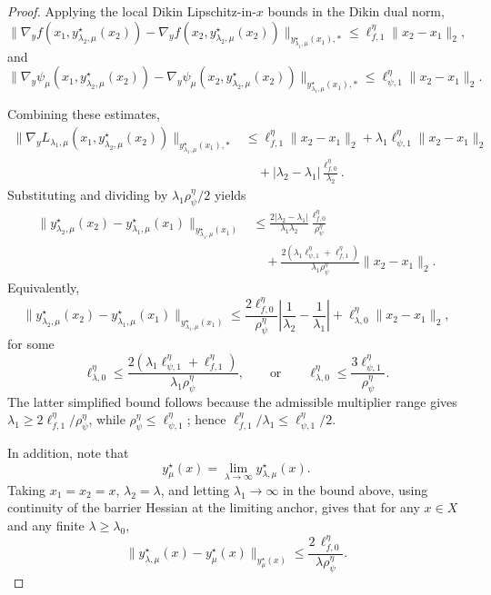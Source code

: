 \documentclass{article}
\begin{document}
\begin{proof}
Applying the local Dikin Lipschitz-in-\(x\) bounds in the Dikin dual norm,
\[
\bigl\|
\nabla_y f(x_1,y_{\lambda_2,\mu}^\star(x_2))
-
\nabla_y f(x_2,y_{\lambda_2,\mu}^\star(x_2))
\bigr\|_{y_{\lambda_1,\mu}^\star(x_1),*}
\le
\ell_{f,1}^\eta\|x_2-x_1\|_2,
\]
and
\[
\bigl\|
\nabla_y\psi_\mu(x_1,y_{\lambda_2,\mu}^\star(x_2))
-
\nabla_y\psi_\mu(x_2,y_{\lambda_2,\mu}^\star(x_2))
\bigr\|_{y_{\lambda_1,\mu}^\star(x_1),*}
\le
\ell_{\psi,1}^\eta\|x_2-x_1\|_2.
\]

Combining these estimates,
\begin{align*}
\bigl\|
\nabla_y L_{\lambda_1,\mu}(x_1,y_{\lambda_2,\mu}^\star(x_2))
\bigr\|_{y_{\lambda_1,\mu}^\star(x_1),*}
&\le
\ell_{f,1}^\eta\|x_2-x_1\|_2
+
\lambda_1\ell_{\psi,1}^\eta\|x_2-x_1\|_2 \\
&\quad
+
|\lambda_2-\lambda_1|\frac{\ell_{f,0}^\eta}{\lambda_2}.
\end{align*}
Substituting and dividing by \(\lambda_1\rho_\psi^\eta/2\) yields
\begin{align*}
\bigl\|
y_{\lambda_2,\mu}^\star(x_2)-y_{\lambda_1,\mu}^\star(x_1)
\bigr\|_{y_{\lambda_1,\mu}^\star(x_1)}
&\le
\frac{2|\lambda_2-\lambda_1|}{\lambda_1\lambda_2}
\frac{\ell_{f,0}^\eta}{\rho_\psi^\eta} \\
&\quad
+
\frac{2(\lambda_1\ell_{\psi,1}^\eta+\ell_{f,1}^\eta)}
{\lambda_1\rho_\psi^\eta}
\|x_2-x_1\|_2 .
\end{align*}
Equivalently,
\[
\bigl\|
y_{\lambda_2,\mu}^\star(x_2)-y_{\lambda_1,\mu}^\star(x_1)
\bigr\|_{y_{\lambda_1,\mu}^\star(x_1)}
\le
\frac{2\ell_{f,0}^{\eta}}{\rho_\psi^\eta}
\left|
\frac1{\lambda_2}-\frac1{\lambda_1}
\right|
+
\ell_{\lambda,0}^{\eta}\|x_2-x_1\|_2,
\]
for some
\[
\ell_{\lambda,0}^{\eta}
\le
\frac{2(\lambda_1\ell_{\psi,1}^{\eta}+\ell_{f,1}^{\eta})}
{\lambda_1\rho_\psi^\eta},
\qquad
\text{or}
\qquad
\ell_{\lambda,0}^{\eta}
\le
\frac{3\ell_{\psi,1}^{\eta}}{\rho_\psi^\eta}.
\]
The latter simplified bound follows because the admissible multiplier range gives
\(\lambda_1\ge 2\ell_{f,1}^{\eta}/\rho_\psi^\eta\), while
\(\rho_\psi^\eta\le \ell_{\psi,1}^{\eta}\); hence
\(\ell_{f,1}^{\eta}/\lambda_1\le \ell_{\psi,1}^{\eta}/2\).

In addition, note that
\[
y_\mu^\star(x)=\lim_{\lambda\to\infty}y_{\lambda,\mu}^\star(x).
\]
Taking \(x_1=x_2=x\), \(\lambda_2=\lambda\), and letting
\(\lambda_1\to\infty\) in the bound above, using continuity of the barrier Hessian at the limiting
anchor, gives that for any \(x\in X\) and any finite \(\lambda\ge\lambda_0\),
\begin{equation}\label{eq:dikin_penalty_bias}
\bigl\|
y_{\lambda,\mu}^\star(x)-y_\mu^\star(x)
\bigr\|_{y_\mu^\star(x)}
\le
\frac{2\,\ell_{f,0}^{\eta}}{\lambda\rho_\psi^\eta}.
\end{equation}
\end{proof}
\end{document}
